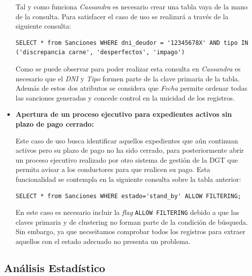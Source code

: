 \documentclass[]{article}
\begin{document}
\begin{itemize}
    Tal y como funciona \textit{Cassandra} es necesario crear una tabla vaya de la mano de la consulta. Para satisfacer el caso de uso se realizará a través de la siguiente consulta:
    \lstset{style=cql}
    \begin{lstlisting}[language=cql, caption=Consulta de todas las sanciones]
        SELECT * from Sanciones WHERE dni_deudor = '12345678X' AND tipo IN ('discrepancia carne', 'desperfectos', 'impago') 
    \end{lstlisting}
    

    Como se puede observar para poder realizar esta consulta en \textit{Cassandra} es necesario que el \textit{DNI} y \textit{Tipo} formen parte de la clave primaria de la tabla. Además de estos dos atributos se considera que \textit{Fecha} permite ordenar todas las sanciones generadas y concede control en la unicidad de los registros. 
    \item \textbf{Apertura de un proceso ejecutivo para expedientes activos sin plazo de pago cerrado:}
    
    Este caso de uso busca identificar aquellos expedientes que aún continuan activos pero su plazo de pago no ha sido cerrado, para posteriormente abrir un proceso ejecutivo realizado por otro sistema de gestión de la DGT que permita avisar a los conductores para que realicen su pago. Esta funcionalidad se contempla en la siguiente consulta sobre la tabla anterior: 
\vspace{0.3cm}

\begin{lstlisting}[language=cql, caption=Consulta de las sanciones pendientes de pago]
        SELECT * from Sanciones WHERE estado='stand_by' ALLOW FILTERING; 
\end{lstlisting}

En este caso es necesario incluir la \textit{flag} \texttt{ALLOW FILTERING} debido a que las claves primaria y de clustering no forman parte de la condición de búsqueda. Sin embargo, ya que necseitamos comprobar todos los registros para extraer aquellos con el estado adecuado no presenta un problema.
\end{itemize}


\subsection{Análisis Estadístico}
\label{subsec:analisis_estadistico}
\end{document}
